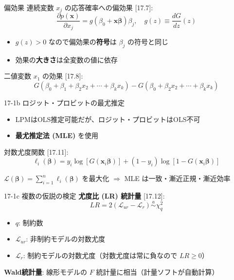 \documentclass[
  ignorenonframetext,
]{beamer}
\providecommand{\tightlist}{%
  \setlength{\itemsep}{0pt}\setlength{\parskip}{0pt}}
\begin{document}
\begin{frame}{偏効果}
\protect\hypertarget{ux504fux52b9ux679c}{}
連続変数 \(x_j\) の応答確率への偏効果 {[}17.7{]}:
\[\frac{\partial p(\mathbf{x})}{\partial x_j} = g(\beta_0 + \mathbf{x\beta})\beta_j, \quad g(z) \equiv \frac{dG}{dz}(z)\]

\begin{itemize}
\tightlist
\item
  \(g(z) > 0\) なので偏効果の\textbf{符号}は \(\beta_j\) の符号と同じ
\item
  効果の\textbf{大きさ}は全変数の値に依存
\end{itemize}

二値変数 \(x_1\) の効果 {[}17.8{]}:
\[G(\beta_0 + \beta_1 + \beta_2 x_2 + \cdots + \beta_k x_k) - G(\beta_0 + \beta_2 x_2 + \cdots + \beta_k x_k)\]
\end{frame}

\begin{frame}{17-1b ロジット・プロビットの最尤推定}
\protect\hypertarget{b-ux30edux30b8ux30c3ux30c8ux30d7ux30edux30d3ux30c3ux30c8ux306eux6700ux5c24ux63a8ux5b9a}{}
\begin{itemize}
\tightlist
\item
  LPMはOLS推定可能だが、ロジット・プロビットはOLS不可
\item
  \textbf{最尤推定法 (MLE)} を使用
\end{itemize}

対数尤度関数 {[}17.11{]}:
\[\ell_i(\boldsymbol{\beta}) = y_i \log[G(\mathbf{x}_i\boldsymbol{\beta})] + (1-y_i)\log[1-G(\mathbf{x}_i\boldsymbol{\beta})]\]

\(\mathcal{L}(\boldsymbol{\beta}) = \sum_{i=1}^n \ell_i(\boldsymbol{\beta})\)
を最大化 \(\Rightarrow\) MLE は一致・漸近正規・漸近効率
\end{frame}

\begin{frame}{17-1c 複数の仮説の検定}
\protect\hypertarget{c-ux8907ux6570ux306eux4eeeux8aacux306eux691cux5b9a}{}
\textbf{尤度比 (LR) 統計量} {[}17.12{]}:
\[LR = 2(\mathcal{L}_{ur} - \mathcal{L}_r) \overset{a}{\sim} \chi^2_q\]

\begin{itemize}
\tightlist
\item
  \(q\): 制約数
\item
  \(\mathcal{L}_{ur}\): 非制約モデルの対数尤度
\item
  \(\mathcal{L}_r\): 制約モデルの対数尤度（対数尤度は常に負なので
  \(LR \geq 0\)）
\end{itemize}

\textbf{Wald統計量}: 線形モデルの \(F\)
統計量に相当（計量ソフトが自動計算）
\end{frame}
\end{document}
